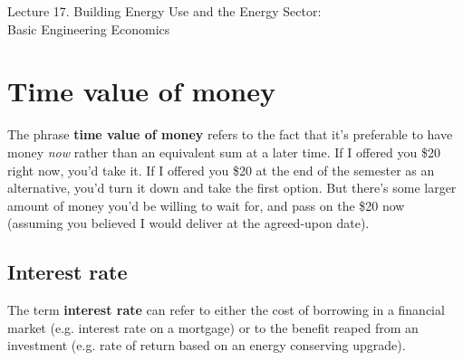 \documentclass[10pt]{article}
\begin{document}
   \noindent
   \begin{center}

   \hrulefill
   
   \vspace{5pt}
   
   \vspace{0pt}
   
   {\Large \hfill  Lecture 17.  
Building Energy Use and the Energy Sector:\\ \hfill Basic Engineering Economics}
   \vspace{5pt}
   
  
   \hrulefill
   \end{center}


   {}

\section{Time value of money}
\label{tv}

   {}
\smallskip

The phrase \textbf{time value of money} refers to the fact that it's preferable to have money \textit{now} rather than an equivalent sum at a later time. If I offered you \$20 right now, you'd take it. If I offered you \$20 at the end of the semester as an alternative, you'd turn it down and take the first option. But there's some larger amount of money you'd be willing to wait for, and pass on the \$20 now (assuming you believed I would deliver at the agreed-upon date).

\subsection{Interest rate}

The term \textbf{interest rate} can refer to either the cost of borrowing in a financial market (e.g. interest rate on a mortgage) or to the benefit reaped from an investment (e.g. rate of return based on an energy conserving upgrade).
\end{document}
